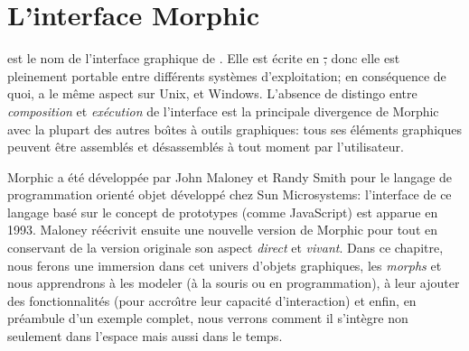 \documentclass[a4paper,10pt,twoside]{book}
\begin{document}
	\renewcommand{\nnbb}[2]{} %
	\sloppy
\fi
\chapter{L'interface Morphic}



%
 est le nom de l'interface graphique de \pharo.
Elle est \'ecrite en \st, donc elle est pleinement portable entre
diff\'erents syst\`emes d'exploitation; en cons\'equence de quoi, \pharo
a le m\^eme aspect sur Unix, \macosx et Windows.
L'absence de distingo entre \emph{composition} et \emph{ex\'ecution}
de l'interface est la principale divergence de Morphic avec la plupart
des autres bo\^{\i}tes \`a outils graphiques: tous ses \'el\'ements
graphiques peuvent \^etre assembl\'es et d\'esassembl\'es \`a tout
moment par l'utilisateur.



Morphic a \'et\'e d\'evelopp\'ee par John Maloney et Randy Smith pour
le langage de programmation orient\'e objet  d\'evelopp\'e
chez Sun Microsystems:
l'interface de ce langage bas\'e sur le concept de prototypes (comme
JavaScript) est apparue en 1993.
Maloney r\'e\'ecrivit ensuite une nouvelle version de Morphic pour
\pharo tout en conservant de la version originale son aspect 
\emph{direct} et 
\emph{vivant}.
Dans ce chapitre, nous ferons une immersion dans cet univers d'objets
graphiques, les \emph{morphs} et nous apprendrons \`a les modeler (\`a la
souris ou en programmation), \`a leur ajouter des fonctionnalit\'es (pour
accro\^{\i}tre leur capacit\'e d'interaction) et enfin, en pr\'eambule
d'un exemple complet, nous verrons comment il s'int\`egre non seulement
dans l'espace mais aussi dans le temps.
\end{document}
